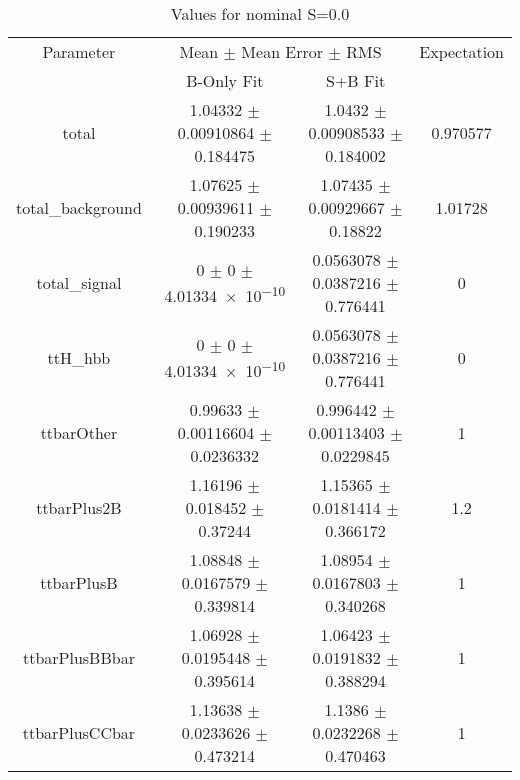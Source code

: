 \begin{table}
\centering
\caption{Values for nominal S=0.0}
\begin{tabular}{cccc}
\toprule
Parameter & \multicolumn{2}{c}{Mean $\pm$ Mean Error $\pm$ RMS} & Expectation\\
 & B-Only Fit & S+B Fit & \\
\midrule
total & \num{1.04332} $\pm$ \num{0.00910864} $\pm$ \num{0.184475} & \num{1.0432} $\pm$ \num{0.00908533} $\pm$ \num{0.184002} & \num{0.970577}\\
total\_background & \num{1.07625} $\pm$ \num{0.00939611} $\pm$ \num{0.190233} & \num{1.07435} $\pm$ \num{0.00929667} $\pm$ \num{0.18822} & \num{1.01728}\\
total\_signal & \num{0} $\pm$ \num{0} $\pm$ \num{4.01334e-10} & \num{0.0563078} $\pm$ \num{0.0387216} $\pm$ \num{0.776441} & \num{0}\\
ttH\_hbb & \num{0} $\pm$ \num{0} $\pm$ \num{4.01334e-10} & \num{0.0563078} $\pm$ \num{0.0387216} $\pm$ \num{0.776441} & \num{0}\\
ttbarOther & \num{0.99633} $\pm$ \num{0.00116604} $\pm$ \num{0.0236332} & \num{0.996442} $\pm$ \num{0.00113403} $\pm$ \num{0.0229845} & \num{1}\\
ttbarPlus2B & \num{1.16196} $\pm$ \num{0.018452} $\pm$ \num{0.37244} & \num{1.15365} $\pm$ \num{0.0181414} $\pm$ \num{0.366172} & \num{1.2}\\
ttbarPlusB & \num{1.08848} $\pm$ \num{0.0167579} $\pm$ \num{0.339814} & \num{1.08954} $\pm$ \num{0.0167803} $\pm$ \num{0.340268} & \num{1}\\
ttbarPlusBBbar & \num{1.06928} $\pm$ \num{0.0195448} $\pm$ \num{0.395614} & \num{1.06423} $\pm$ \num{0.0191832} $\pm$ \num{0.388294} & \num{1}\\
ttbarPlusCCbar & \num{1.13638} $\pm$ \num{0.0233626} $\pm$ \num{0.473214} & \num{1.1386} $\pm$ \num{0.0232268} $\pm$ \num{0.470463} & \num{1}\\
\bottomrule
\end{tabular}
\end{table}